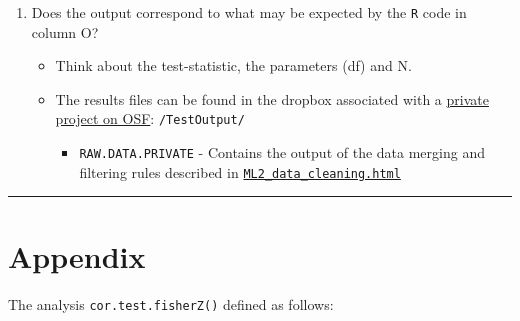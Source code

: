 \documentclass[]{article}
\begin{document}
\begin{enumerate}
\def\labelenumi{\arabic{enumi}.}
\setcounter{enumi}{1}
\itemsep1pt\parskip0pt
\item
  Does the output correspond to what may be expected by the \texttt{R}
  code in column O?

  \begin{itemize}
  \itemsep1pt\parskip0pt
  \item
    Think about the test-statistic, the parameters (df) and N.
  \item
    The results files can be found in the dropbox associated with a
    \href{https://osf.io/fprzu/}{private project on OSF}:
    \texttt{/TestOutput/}

    \begin{itemize}
    \itemsep1pt\parskip0pt
    \item
      \texttt{RAW.DATA.PRIVATE} - Contains the output of the data
      merging and filtering rules described in
      \href{http://fredhasselman.com/htmlHost/ManyLabs/ML2_data_cleaning.html}{\texttt{ML2\_data\_cleaning.html}}
    \end{itemize}
  \end{itemize}
\end{enumerate}

\begin{center}\rule{0.5\linewidth}{\linethickness}\end{center}

\section{Appendix}\label{appendix}

The analysis \texttt{cor.test.fisherZ()} defined as follows:
\end{document}
